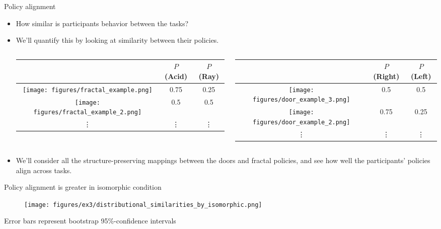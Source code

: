 \documentclass{beamer}
\begin{document}
\begin{frame}{Policy alignment}
\begin{itemize}
\item How similar is participants behavior between the tasks? 
\item<2-> We'll quantify this by looking at similarity between their policies.
\begin{columns}
\begin{column}{0.5\textwidth}
\begin{center}
\begin{tabular}{|c|c|c|}
\hline 
& \(P\)(Acid) & \(P\)(Ray) \\
\hline
\texttt{[image: figures/fractal\_example.png]} & 0.75 & 0.25\\ \hline
\texttt{[image: figures/fractal\_example\_2.png]} & 0.5 & 0.5 \\ \hline
 \vdots & \vdots & \vdots \\ \hline
\end{tabular}
\end{center}
\end{column}
\begin{column}{0.5\textwidth}
\begin{center}
\begin{tabular}{|c|c|c|}
\hline 
& \(P\)(Right) & \(P\)(Left) \\
\hline
\texttt{[image: figures/door\_example\_3.png]} & 0.5 & 0.5\\ \hline
\texttt{[image: figures/door\_example\_2.png]} & 0.75 & 0.25 \\ \hline
 \vdots & \vdots & \vdots \\ \hline
\end{tabular}
\end{center}
\end{column}
\end{columns}
\item<3-> We'll consider all the structure-preserving mappings between the doors and fractal policies, and see how well the participants' policies align across tasks.
\end{itemize}
\end{frame}

\begin{frame}{Policy alignment is greater in isomorphic condition}
\begin{figure}
\centering
\texttt{[image: figures/ex3/distributional\_similarities\_by\_isomorphic.png]}
\end{figure}
{\scriptsize Error bars represent bootstrap 95\%-confidence intervals}
\end{frame}
\end{document}
